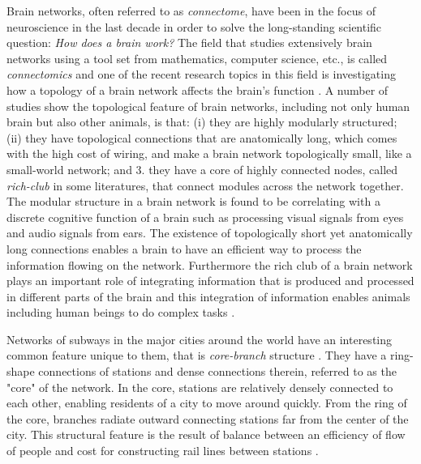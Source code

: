 \documentclass{article}
\begin{document}
Brain networks, often referred to as \textit{connectome}, have been in the focus of neuroscience in the last decade in order to solve the long-standing scientific question: \textit{How does a brain work?}  The field that studies extensively brain networks using a tool set from mathematics, computer science, etc., is called \textit{connectomics} and one of the recent research topics in this field is investigating how a topology of a brain network affects the brain's function \cite{ComparativeConnectome}. A number of studies show the topological feature of brain networks, including not only human brain but also other animals, is that: (i) they are highly modularly structured; (ii) they have topological connections that are anatomically long, which comes with the high cost of wiring, and make a brain network topologically small, like a small-world network; and 3. they have a core of highly connected nodes, called \textit{rich-club} in some literatures, that connect modules across the network together. The modular structure in a brain network is found to be correlating with a discrete cognitive function of a brain such as processing visual signals from eyes and audio signals from ears. The existence of topologically short yet anatomically long connections enables a brain to have an efficient way to process the information flowing on the network. Furthermore the rich club of a brain network plays an important role of integrating information that is produced and processed in different parts of the brain and this integration of information enables animals including human beings to do complex tasks \cite{BrainEconomy}.

Networks of subways in the major cities around the world have an interesting common feature unique to them, that is \textit{core-branch} structure \cite{Train}. They have a ring-shape connections of stations and dense connections therein, referred to as the "core" of the network. In the core, stations are relatively densely connected to each other, enabling residents of a city to move around quickly. From the ring of the core, branches radiate outward connecting stations far from the center of the city. This structural feature is the result of balance between an efficiency of flow of people and cost for constructing rail lines between stations \cite{SpatioalNetwork1,SpatioalNetwork2}. 


	
\end{document}
